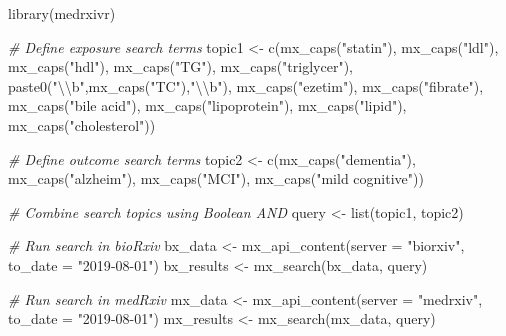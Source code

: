\documentclass[a4paper, twoside]{templates/ociamthesis}
\newenvironment{Shaded}{\begin{snugshade}}{\end{snugshade}}
\newcommand{\AttributeTok}[1]{\textcolor[rgb]{0.77,0.63,0.00}{#1}}
\newcommand{\CommentTok}[1]{\textcolor[rgb]{0.56,0.35,0.01}{\textit{#1}}}
\newcommand{\FunctionTok}[1]{\textcolor[rgb]{0.00,0.00,0.00}{#1}}
\newcommand{\NormalTok}[1]{#1}
\newcommand{\OtherTok}[1]{\textcolor[rgb]{0.56,0.35,0.01}{#1}}
\newcommand{\SpecialCharTok}[1]{\textcolor[rgb]{0.00,0.00,0.00}{#1}}
\newcommand{\StringTok}[1]{\textcolor[rgb]{0.31,0.60,0.02}{#1}}
\renewenvironment{Shaded}
{
  \vspace{4pt}%
  \begin{snugshade}%
}{%
  \end{snugshade}%
  \vspace{4pt}%
}
\begin{document}
\begin{Shaded}
\begin{Highlighting}[]
\FunctionTok{library}\NormalTok{(medrxivr)}

\CommentTok{\# Define exposure search terms}
\NormalTok{topic1 }\OtherTok{\textless{}{-}} \FunctionTok{c}\NormalTok{(}\FunctionTok{mx\_caps}\NormalTok{(}\StringTok{"statin"}\NormalTok{),}
            \FunctionTok{mx\_caps}\NormalTok{(}\StringTok{"ldl"}\NormalTok{),}
            \FunctionTok{mx\_caps}\NormalTok{(}\StringTok{"hdl"}\NormalTok{),}
            \FunctionTok{mx\_caps}\NormalTok{(}\StringTok{"TG"}\NormalTok{),}
            \FunctionTok{mx\_caps}\NormalTok{(}\StringTok{"triglycer"}\NormalTok{),}
            \FunctionTok{paste0}\NormalTok{(}\StringTok{"}\SpecialCharTok{\textbackslash{}\textbackslash{}}\StringTok{b"}\NormalTok{,}\FunctionTok{mx\_caps}\NormalTok{(}\StringTok{"TC"}\NormalTok{),}\StringTok{"}\SpecialCharTok{\textbackslash{}\textbackslash{}}\StringTok{b"}\NormalTok{),}
            \FunctionTok{mx\_caps}\NormalTok{(}\StringTok{"ezetim"}\NormalTok{),}
            \FunctionTok{mx\_caps}\NormalTok{(}\StringTok{"fibrate"}\NormalTok{),}
            \FunctionTok{mx\_caps}\NormalTok{(}\StringTok{"bile acid"}\NormalTok{),}
            \FunctionTok{mx\_caps}\NormalTok{(}\StringTok{"lipoprotein"}\NormalTok{),}
            \FunctionTok{mx\_caps}\NormalTok{(}\StringTok{"lipid"}\NormalTok{),}
            \FunctionTok{mx\_caps}\NormalTok{(}\StringTok{"cholesterol"}\NormalTok{))}

\CommentTok{\# Define outcome search terms}
\NormalTok{topic2 }\OtherTok{\textless{}{-}} \FunctionTok{c}\NormalTok{(}\FunctionTok{mx\_caps}\NormalTok{(}\StringTok{"dementia"}\NormalTok{),}
            \FunctionTok{mx\_caps}\NormalTok{(}\StringTok{"alzheim"}\NormalTok{),}
            \FunctionTok{mx\_caps}\NormalTok{(}\StringTok{"MCI"}\NormalTok{),}
            \FunctionTok{mx\_caps}\NormalTok{(}\StringTok{"mild cognitive"}\NormalTok{))}

\CommentTok{\# Combine search topics using Boolean AND}
\NormalTok{query }\OtherTok{\textless{}{-}} \FunctionTok{list}\NormalTok{(topic1, topic2)}

\CommentTok{\# Run search in bioRxiv}
\NormalTok{bx\_data }\OtherTok{\textless{}{-}} \FunctionTok{mx\_api\_content}\NormalTok{(}\AttributeTok{server =} \StringTok{"biorxiv"}\NormalTok{,}
                          \AttributeTok{to\_date =} \StringTok{"2019{-}08{-}01"}\NormalTok{)}
\NormalTok{bx\_results }\OtherTok{\textless{}{-}} \FunctionTok{mx\_search}\NormalTok{(bx\_data, query)}

\CommentTok{\# Run search in medRxiv}
\NormalTok{mx\_data }\OtherTok{\textless{}{-}} \FunctionTok{mx\_api\_content}\NormalTok{(}\AttributeTok{server =} \StringTok{"medrxiv"}\NormalTok{,}
                          \AttributeTok{to\_date =} \StringTok{"2019{-}08{-}01"}\NormalTok{)}
\NormalTok{mx\_results }\OtherTok{\textless{}{-}} \FunctionTok{mx\_search}\NormalTok{(mx\_data, query)}
\end{Highlighting}
\end{Shaded}
\end{document}
